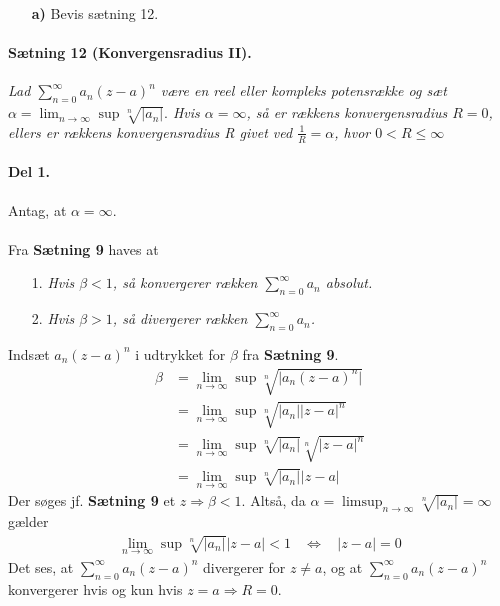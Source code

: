 \documentclass[12pt]{article}
\begin{document}
\maketitle
\begin{itemize}
\item[\textbf{a)}] Bevis sætning 12.
\end{itemize}
\paragraph{Sætning 12 (Konvergensradius II).} \textit{ Lad $\sum_{n = 0}^{\infty} a_n(z-a)^n$ være en reel eller kompleks potensrække og sæt $ \alpha = \lim_{n \rightarrow \infty} \sup \sqrt[n]{\vert a_n \vert}.$ Hvis $\alpha =\infty$, så er rækkens konvergensradius $R=0$, ellers er rækkens konvergensradius R givet ved $\frac{1}{R}=\alpha$, hvor $0< R \leq \infty$}\\
\paragraph{Del 1.} Antag, at $\alpha =\infty$.\\
\\
Fra \textbf{Sætning 9} haves at
\begin{itemize}
\item[1.] \textit{Hvis $\beta<1$, så konvergerer rækken $\sum_{n = 0}^{\infty} a_n$ absolut.}
\item[2.] \textit{Hvis $\beta>1$, så divergerer rækken $\sum_{n = 0}^{\infty} a_n$.}
\end{itemize}
Indsæt $a_n(z-a)^n$ i udtrykket for $\beta$ fra \textbf{Sætning 9}.
\begin{align} \label{omskrivning}
\beta &=\lim_{n \rightarrow \infty} \sup \sqrt[n]{\vert a_n(z-a)^n \vert}\\
&= \lim_{n \rightarrow \infty} \sup \sqrt[n]{\vert a_n\vert \vert z-a \vert ^n} \nonumber \\
&= \lim_{n \rightarrow \infty} \sup \sqrt[n]{\vert a_n\vert}\sqrt[n]{\vert z-a \vert ^n} \nonumber\\
&=\lim_{n \rightarrow \infty} \sup \sqrt[n]{\vert a_n\vert}\vert z-a \vert
\end{align}
Der søges jf. \textbf{Sætning 9} et $z \Rightarrow \beta <1$. Altså, da $\alpha = \limsup_{n \rightarrow \infty} \sqrt[n]{\vert a_n \vert} =  \infty$ gælder
\begin{align}
\lim_{n \rightarrow \infty} \sup \sqrt[n]{\vert a_n\vert}\vert z-a \vert
< 1 \phantom{m} \Leftrightarrow \phantom{m}  \vert z-a \vert = 0
\end{align}
Det ses, at $\sum_{n = 0}^{\infty} a_n(z-a)^n$ divergerer for $z \neq a$, og at $\sum_{n = 0}^{\infty} a_n(z-a)^n$ konvergerer hvis og kun hvis $z=a \Rightarrow R = 0$.
\end{document}
